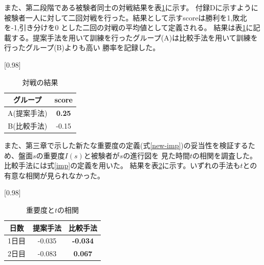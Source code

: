 \begin{table}[H]
    \caption{先読み手数制限なしの場合}
    \scriptsize
    \centering
    \label{table:system-100}
\end{table}
また、第二段階である被験者同士の対戦結果を表\ref{table:result-battle}に示す。
付録Dに示すように被験者一人に対して二回対戦を行った。結果として示すscoreは勝利を1,敗北を-1,引き分けを0
とした二回の対戦の平均値として定義される。
結果は表\ref{table:result-battle}に記載する。提案手法を用いて訓練を行ったグループ(A)は比較手法を用いて訓練を行ったグループ(B)よりも高い
勝率を記録した。
\begin{table}[H]
	\caption{対戦の結果}
    \label{table:result-battle}
	\centering
	\scalebox{0.98}[0.98]{
		\begin{tabular}{c|c}
			グループ & score \\ \hline
			A(提案手法)    & \bf{0.25} \\ 
			B(比較手法)    & -0.15 \\
		\end{tabular}
	}
	
\end{table}
また、第三章で示した新たな重要度の定義(式\ref{new-imp})の妥当性を検証するため、盤面$s$の重要度$I(s)$と被験者が$s$の進行図を
見た時間$t$の相関を調査した。比較手法には式\ref{imp}の定義を用いた。
結果を表\ref{table:result-imp}に示す。いずれの手法も$t$との有意な相関が見られなかった。
\begin{table}[H]
	\caption{重要度と$t$の相関}
    \label{table:result-imp}
	\centering
	\scalebox{0.98}[0.98]{
		\begin{tabular}{c|c|c}
			日数& 提案手法 & 比較手法 \\ \hline
			1日目& {-0.035}& \bf{-0.034}\\
            2日目& {-0.083}& \bf{0.067}\\
		\end{tabular}
	}
	
\end{table}


